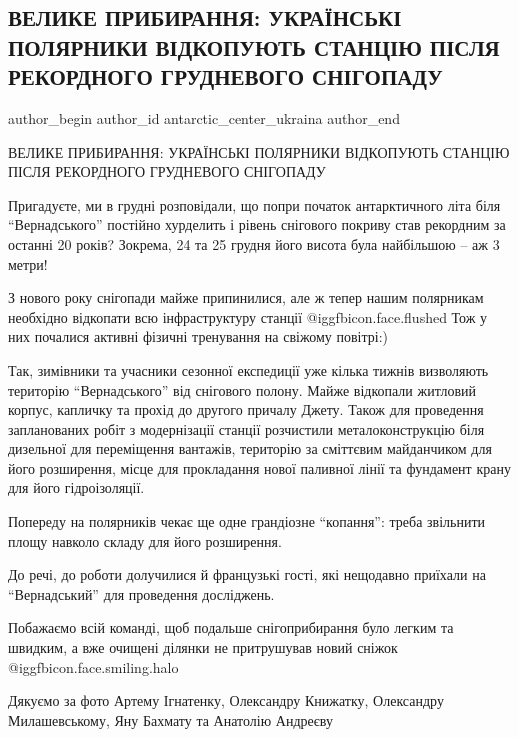  
 
 
 
 
 
\subsection{ВЕЛИКЕ ПРИБИРАННЯ: УКРАЇНСЬКІ ПОЛЯРНИКИ ВІДКОПУЮТЬ СТАНЦІЮ ПІСЛЯ РЕКОРДНОГО ГРУДНЕВОГО СНІГОПАДУ}
\label{sec:15_01_2022.fb.antarctic_center_ukraina.1.velyke_prybyrannja}
 
\ifcmt
 author_begin
   author_id antarctic_center_ukraina
 author_end
\fi

ВЕЛИКЕ ПРИБИРАННЯ: УКРАЇНСЬКІ ПОЛЯРНИКИ ВІДКОПУЮТЬ СТАНЦІЮ ПІСЛЯ РЕКОРДНОГО
ГРУДНЕВОГО СНІГОПАДУ

Пригадуєте, ми в грудні розповідали, що попри початок антарктичного літа біля
\enquote{Вернадського} постійно хурделить і рівень снігового покриву став рекордним за
останні 20 років? Зокрема, 24 та 25 грудня його висота була найбільшою – аж 3
метри!


З нового року снігопади майже припинилися, але ж тепер нашим полярникам
необхідно відкопати всю інфраструктуру станції @igg{fbicon.face.flushed}  Тож у
них почалися активні фізичні тренування на свіжому повітрі:)

Так, зимівники та учасники сезонної експедиції уже кілька тижнів визволяють
територію \enquote{Вернадського} від снігового полону. Майже відкопали житловий
корпус, капличку та прохід до другого причалу Джету. Також для проведення
запланованих робіт з модернізації станції розчистили металоконструкцію біля
дизельної для переміщення вантажів, територію за сміттєвим майданчиком для його
розширення, місце для прокладання нової паливної лінії та фундамент крану для
його гідроізоляції.


Попереду на полярників чекає ще одне грандіозне \enquote{копання}: треба звільнити
площу навколо складу для його розширення.

До речі, до роботи долучилися й французькі гості, які нещодавно приїхали на
\enquote{Вернадський} для проведення досліджень.


Побажаємо всій команді, щоб подальше снігоприбирання було легким та швидким, а
вже очищені ділянки не притрушував новий сніжок @igg{fbicon.face.smiling.halo} 

Дякуємо за фото Артему Ігнатенку, Олександру Книжатку, Олександру
Милашевському, Яну Бахмату та Анатолію Андреєву
